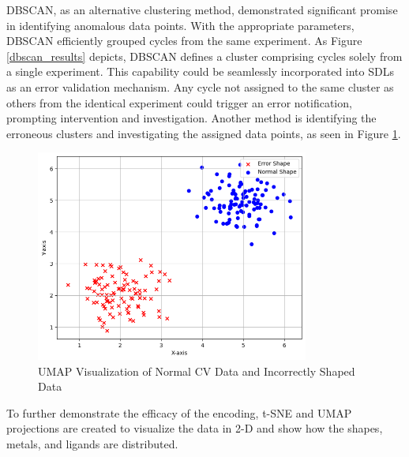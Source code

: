 DBSCAN, as an alternative clustering method, demonstrated significant promise in identifying anomalous data points. With the appropriate parameters, DBSCAN efficiently grouped cycles from the same experiment. As Figure \ref{dbscan_results} depicts, DBSCAN defines a cluster comprising cycles solely from a single experiment. This capability could be seamlessly incorporated into SDLs as an error validation mechanism. Any cycle not assigned to the same cluster as others from the identical experiment could trigger an error notification, prompting intervention and investigation. Another method is identifying the erroneous clusters and investigating the assigned data points, as seen in Figure \ref{error_detection}.
\begin{figure}[!h]
  \centering
    \includegraphics[width=0.8\textwidth]{figures/error_detection.png}
    \caption{UMAP Visualization of Normal CV Data and Incorrectly Shaped Data}
    \label{error_detection}
\end{figure}
To further demonstrate the efficacy of the encoding, t-SNE and UMAP projections are created to visualize the data in 2-D and show how the shapes, metals, and ligands are distributed. 
